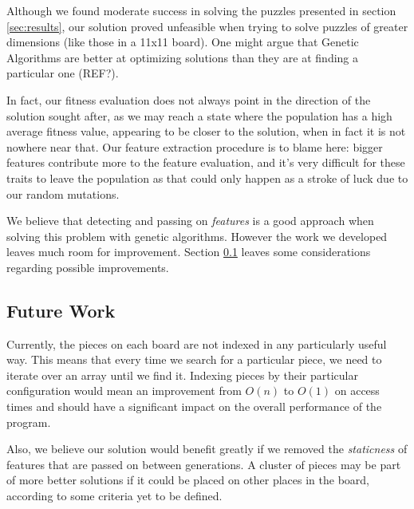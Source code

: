 \documentclass{llncs}
\begin{document}
Although we found moderate success in solving the puzzles presented in section \ref{sec:results}, our solution proved unfeasible when trying to solve puzzles of greater dimensions (like those in a 11x11 board). One might argue that Genetic Algorithms are better at optimizing solutions than they are at finding a particular one (REF?).

In fact, our fitness evaluation does not always point in the direction of the solution sought after, as we may reach a state where the population has a high average fitness value, appearing to be closer to the solution, when in fact it is not nowhere near that. Our feature extraction procedure is to blame here: bigger features contribute more to the feature evaluation, and it's very difficult for these traits to leave the population as that could only happen as a stroke of luck due to our random mutations.

We believe that detecting and passing on \textit{features} is a good approach when solving this problem with genetic algorithms. However the work we developed leaves much room for improvement. Section \ref{sec:conclusions_futurework} leaves some considerations regarding possible improvements.

\subsection{Future Work}\label{sec:conclusions_futurework}

Currently, the pieces on each board are not indexed in any particularly useful way. This means that every time we search for a particular piece, we need to iterate over an array until we find it. Indexing pieces by their particular configuration would mean an improvement from $O(n)$ to $O(1)$ on access times and should have a significant impact on the overall performance of the program.

Also, we believe our solution would benefit greatly if we removed the \textit{staticness} of features that are passed on between generations. A cluster of pieces may be part of more better solutions if it could be placed on other places in the board, according to some criteria yet to be defined.





\newpage
\end{document}
